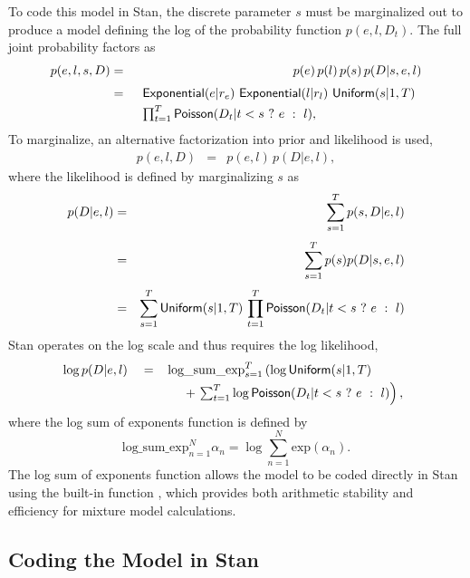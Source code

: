 To code this model in Stan, the discrete parameter $s$ must be
marginalized out to produce a model defining the log of the
probability function $p(e,l,D_t)$.  The full joint probability factors
as 
%
\begin{eqnarray*}
p(e,l,s,D)
& = & p(e) \, p(l) \, p(s) \, p(D | s, e, l)
\\[3pt]
& = & 
\begin{array}[t]{l}
\distro{Exponential}(e|r_e) \ \distro{Exponential}(l|r_l) \ \distro{Uniform}(s|1,T)
\\[3pt]
\prod_{t=1}^T \distro{Poisson}(D_t | t < s \ ? \ e \ : \ l),
\end{array}
\end{eqnarray*}
%
To marginalize, an alternative factorization into prior and likelihood
is used,
%
\begin{eqnarray*}
p(e,l,D) & = & p(e,l) \, p(D|e,l),
\end{eqnarray*}
%
where the likelihood is defined by marginalizing $s$ as
%
\begin{eqnarray*}
p(D | e,l) 
& = &
\sum_{s=1}^T p(s, D | e,l)
\\[3pt]
& = &
\sum_{s=1}^T p(s) p(D | s,e,l)
\\[3pt]
& = &
\sum_{s=1}^T \distro{Uniform}(s | 1,T) 
\, \prod_{t=1}^T \distro{Poisson}(D_t | t < s \ ? \ e \ : \ l)
\end{eqnarray*}
%
Stan operates on the log scale and thus requires the log likelihood,
%
\[
\log p(D | e,l)
\\[3pt]
\mbox{ } \ \ = \
\begin{array}[t]{l}
\mbox{log\_sum\_exp}_{s=1}^T 
\left( \log \distro{Uniform}(s | 1,T) \right.
\\[3pt]
{} \hspace*{12pt} + \left. \sum_{t=1}^T \log \distro{Poisson}(D_t | t < s \ ?
\ e \ : \ l) \right),
\end{array}
\]
%
where the log sum of exponents function is defined by
\[
\mbox{log\_sum\_exp}_{n=1}^N \alpha_n
=
\log \sum_{n=1}^N \mbox{exp}(\alpha_n).
\]
%
The log sum of exponents function allows the model to be coded
directly in Stan using the built-in function ,
which provides both arithmetic stability and efficiency for mixture
model calculations.


\subsection{Coding the Model in Stan}

